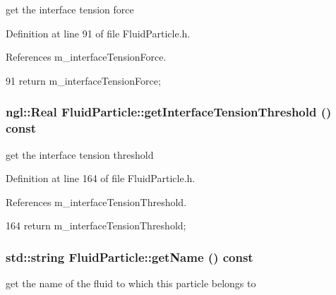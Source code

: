 get the interface tension force 



Definition at line 91 of file FluidParticle.h.



References m\_\-interfaceTensionForce.




\begin{DoxyCode}
91 { return m_interfaceTensionForce; }
\end{DoxyCode}


\hypertarget{class_fluid_particle_a95997fec4d4cc300fc327e4688ba3e40}{
\subsubsection[{getInterfaceTensionThreshold}]{\setlength{\rightskip}{0pt plus 5cm}ngl::Real FluidParticle::getInterfaceTensionThreshold () const}}
\label{class_fluid_particle_a95997fec4d4cc300fc327e4688ba3e40}


get the interface tension threshold 



Definition at line 164 of file FluidParticle.h.



References m\_\-interfaceTensionThreshold.




\begin{DoxyCode}
164 { return m_interfaceTensionThreshold; }
\end{DoxyCode}


\hypertarget{class_fluid_particle_a0c75715af37734d00ab61b57fbc0e591}{
\subsubsection[{getName}]{\setlength{\rightskip}{0pt plus 5cm}std::string FluidParticle::getName () const}}
\label{class_fluid_particle_a0c75715af37734d00ab61b57fbc0e591}


get the name of the fluid to which this particle belongs to 




